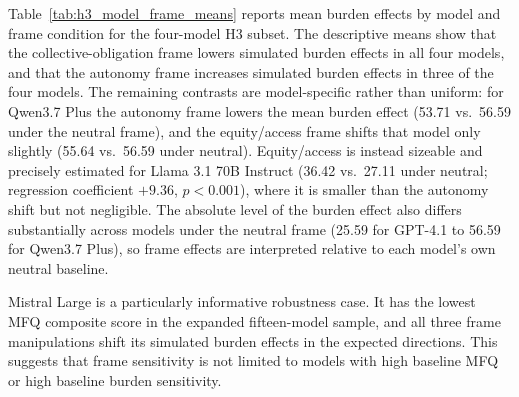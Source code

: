 Table~\ref{tab:h3_model_frame_means} reports mean burden effects by model and frame condition for the four-model H3 subset. The descriptive means show that the collective-obligation frame lowers simulated burden effects in all four models, and that the autonomy frame increases simulated burden effects in three of the four models. The remaining contrasts are model-specific rather than uniform: for Qwen3.7 Plus the autonomy frame lowers the mean burden effect (53.71 vs.\ 56.59 under the neutral frame), and the equity/access frame shifts that model only slightly (55.64 vs.\ 56.59 under neutral). Equity/access is instead sizeable and precisely estimated for Llama 3.1 70B Instruct (36.42 vs.\ 27.11 under neutral; regression coefficient $+9.36$, $p<0.001$), where it is smaller than the autonomy shift but not negligible. The absolute level of the burden effect also differs substantially across models under the neutral frame (25.59 for GPT-4.1 to 56.59 for Qwen3.7 Plus), so frame effects are interpreted relative to each model's own neutral baseline.

Mistral Large is a particularly informative robustness case. It has the lowest MFQ composite score in the expanded fifteen-model sample, and all three frame manipulations shift its simulated burden effects in the expected directions. This suggests that frame sensitivity is not limited to models with high baseline MFQ or high baseline burden sensitivity.

